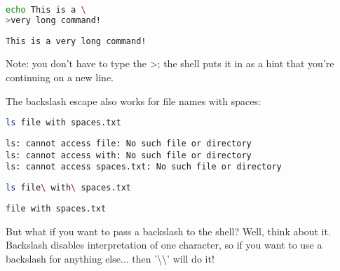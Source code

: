 \lstset{basicstyle=\scriptsize, numbers=left, captionpos=b, tabsize=4}
\begin{lstlisting}[caption=A multiline command,language={bash},
breaklines=true,xleftmargin=15pt,label=lst:A multiline command]
echo This is a \
>very long command!
\end{lstlisting}

\scriptsize
\begin{verbatim}
This is a very long command!
\end{verbatim}
\normalsize

Note: you don't have to type the \textgreater{}; the shell puts it in as a hint
that you're continuing on a new line.

The backslash escape also works for file names with spaces:

\lstset{basicstyle=\scriptsize, numbers=left, captionpos=b, tabsize=4}
\begin{lstlisting}[caption=Difficult file to list...,language={bash},
breaklines=true,xleftmargin=15pt,label=lst:Difficult file to list...]
ls file with spaces.txt
\end{lstlisting}

\scriptsize
\begin{verbatim}
ls: cannot access file: No such file or directory
ls: cannot access with: No such file or directory
ls: cannot access spaces.txt: No such file or directory
\end{verbatim}
\normalsize

\lstset{basicstyle=\scriptsize, numbers=left, captionpos=b, tabsize=4}
\begin{lstlisting}[caption=Listing the file using escapes,language={bash},
breaklines=true,xleftmargin=15pt,label=lst:Listing the file using escapes]
ls file\ with\ spaces.txt
\end{lstlisting}

\scriptsize
\begin{verbatim}
file with spaces.txt
\end{verbatim}
\normalsize

But what if you want to pass a backslash to the shell? Well, think about it.
Backslash disables interpretation of one character, so if you want to use a
backslash for anything else... then '\textbackslash{}\textbackslash{}' will do
it!

